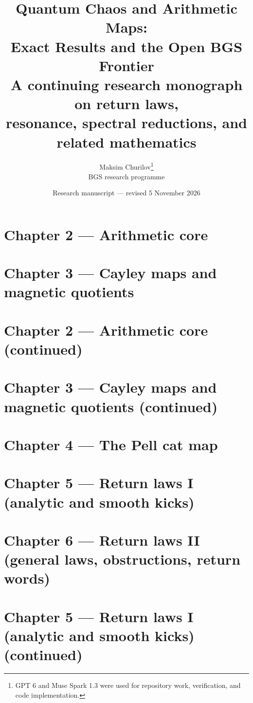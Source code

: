 \documentclass[11pt,a4paper]{article}
\title{\textbf{Quantum Chaos and Arithmetic Maps:}\\Exact Results and the Open BGS Frontier\\[1ex]\large A continuing research monograph on return laws,\\resonance, spectral reductions, and related mathematics}
\author{Maksim Churilov\thanks{GPT 6 and Muse Spark 1.3 were used for repository work, verification, and code implementation.}\\\small BGS research programme}\date{Research manuscript --- revised 5 November 2026}
\numberwithin{equation}{section}
\begin{document}


\part*{Chapter 2 --- Arithmetic core}

\part*{Chapter 3 --- Cayley maps and magnetic quotients}

\part*{Chapter 2 --- Arithmetic core (continued)}

\part*{Chapter 3 --- Cayley maps and magnetic quotients (continued)}



\part*{Chapter 4 --- The Pell cat map}



\part*{Chapter 5 --- Return laws I (analytic and smooth kicks)}


\part*{Chapter 6 --- Return laws II (general laws, obstructions, return words)}

\part*{Chapter 5 --- Return laws I (analytic and smooth kicks) (continued)}

\end{document}
